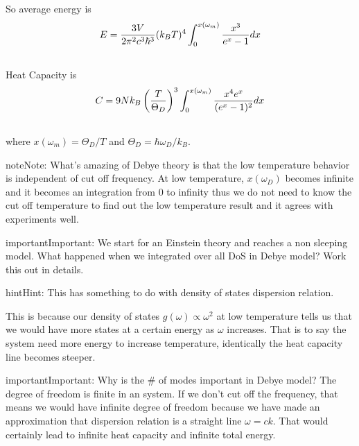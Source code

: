 \documentclass[letterpaper,10pt,english]{sphinxmanual}
\begin{document}
So average energy is
\begin{gather}
\begin{split}E = \frac{3V}{2\pi^2 c^3 \hbar^3} (k_B T)^4 \int_0^{x(\omega_m)} \frac{x^3}{e^x - 1} d x\end{split}\notag\\\begin{split}\end{split}\notag
\end{gather}
Heat Capacity is
\begin{gather}
\begin{split}C = 9 N k_B \left(\frac{T}{\Theta_D}\right)^3 \int _ 0 ^{x(\omega_m)} \frac{x^4 e^x}{(e^x - 1)^2} d x\end{split}\notag\\\begin{split}\end{split}\notag
\end{gather}
where $x(\omega_m) = \Theta_D/ T$ and $\Theta_D = \hbar \omega_D/k_B$.

\begin{notice}{note}{Note:}
What's amazing of Debye theory is that the low temperature behavior is independent of cut off frequency. At low temperature, $x(\omega_D)$ becomes infinite and it becomes an integration from 0 to infinity thus we do not need to know the cut off temperature to find out the low temperature result and it agrees with experiments well.
\end{notice}

\begin{notice}{important}{Important:}
We start for an Einstein theory and reaches a non sleeping model. What happened when we integrated over all DoS in Debye model? Work this out in details.

\begin{notice}{hint}{Hint:}
This has something to do with density of states dispersion relation.
\end{notice}

This is because our density of states $g(\omega)\propto \omega^2$ at low temperature tells us that we would have more states at a certain energy as $\omega$ increases. That is to say the system need more energy to increase temperature, identically the heat capacity line becomes steeper.
\end{notice}

\begin{notice}{important}{Important:}
Why is the \# of modes important in Debye model? The degree of freedom is finite in an system. If we don't cut off the frequency, that means we would have infinite degree of freedom because we have made an approximation that dispersion relation is a straight line $\omega = c k$. That would certainly lead to infinite heat capacity and infinite total energy.
\end{notice}
\end{document}
